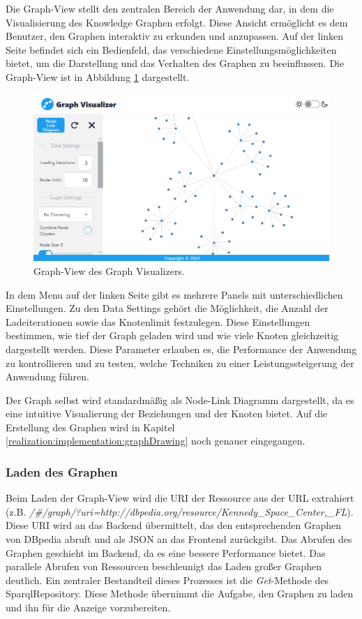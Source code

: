 Die Graph-View stellt den zentralen Bereich der Anwendung dar, in dem die Visualisierung des Knowledge Graphen erfolgt. Diese Ansicht ermöglicht es dem Benutzer, den Graphen interaktiv zu erkunden und anzupassen. Auf der linken Seite befindet sich ein Bedienfeld, das verschiedene Einstellungsmöglichkeiten bietet, um die Darstellung und das Verhalten des Graphen zu beeinflussen. Die Graph-View ist in Abbildung \ref{fig:realization:implementation:graphview} dargestellt.

\begin{figure}[h]
    \centering
    \includegraphics[height=.5\textwidth]{images/03/GraphView.png}
    \caption{Graph-View des Graph Visualizers.}
    \label{fig:realization:implementation:graphview}
\end{figure}

In dem Menu auf der linken Seite gibt es mehrere Panels mit unterschiedlichen Einstellungen. Zu den Data Settings gehört die Möglichkeit, die Anzahl der Ladeiterationen sowie das Knotenlimit festzulegen. Diese Einstellungen bestimmen, wie tief der Graph geladen wird und wie viele Knoten gleichzeitig dargestellt werden. Diese Parameter erlauben es, die Performance der Anwendung zu kontrollieren und zu testen, welche Techniken zu einer Leistungssteigerung der Anwendung führen.

Der Graph selbst wird standardmäßig als Node-Link Diagramm dargestellt, da es eine intuitive Visualierung der Beziehungen und der Knoten bietet. Auf die Erstellung des Graphen wird in Kapitel \ref{realization:implementation:graphDrawing} noch genauer eingegangen.

\subsubsection{Laden des Graphen}

Beim Laden der Graph-View wird die URI der Ressource aus der URL extrahiert (z.B. \textit{/\#/graph/?uri=http://dbpedia.org/resource/Kennedy\_Space\_Center,\_FL}). Diese URI wird an das Backend übermittelt, das den entsprechenden Graphen von DBpedia abruft und als JSON an das Frontend zurückgibt. Das Abrufen des Graphen geschieht im Backend, da es eine bessere Performance bietet. Das parallele Abrufen von Ressourcen beschleunigt das Laden großer Graphen deutlich. Ein zentraler Bestandteil dieses Prozesses ist die \textit{Get}-Methode des SparqlRepository. Diese Methode übernimmt die Aufgabe, den Graphen zu laden und ihn für die Anzeige vorzubereiten.

